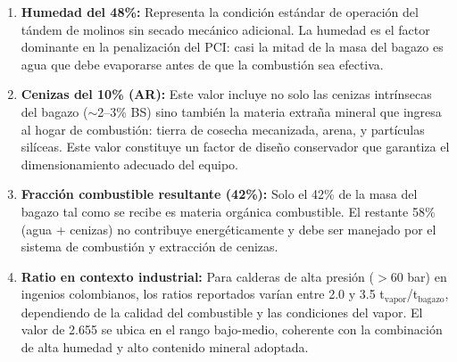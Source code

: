 \begin{enumerate}
	\item \textbf{Humedad del 48\%:} Representa la condición estándar de operación del tándem de molinos sin secado mecánico adicional. La humedad es el factor dominante en la penalización del PCI: casi la mitad de la masa del bagazo es agua que debe evaporarse antes de que la combustión sea efectiva.
	\item \textbf{Cenizas del 10\% (AR):} Este valor incluye no solo las cenizas intrínsecas del bagazo ($\sim$2--3\% BS) sino también la materia extraña mineral que ingresa al hogar de combustión: tierra de cosecha mecanizada, arena, y partículas silíceas. Este valor constituye un factor de diseño conservador que garantiza el dimensionamiento adecuado del equipo.
	\item \textbf{Fracción combustible resultante (42\%):} Solo el 42\% de la masa del bagazo tal como se recibe es materia orgánica combustible. El restante 58\% (agua + cenizas) no contribuye energéticamente y debe ser manejado por el sistema de combustión y extracción de cenizas.
	\item \textbf{Ratio en contexto industrial:} Para calderas de alta presión ($>$60 bar) en ingenios colombianos, los ratios reportados varían entre 2.0 y 3.5 t$_{\text{vapor}}$/t$_{\text{bagazo}}$, dependiendo de la calidad del combustible y las condiciones del vapor. El valor de 2.655 se ubica en el rango bajo-medio, coherente con la combinación de alta humedad y alto contenido mineral adoptada.
\end{enumerate}
